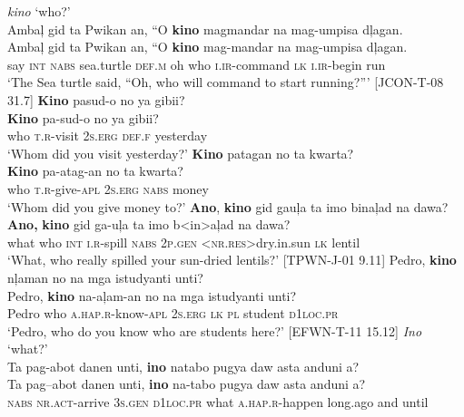 \newpage
\ea
\textit{kino} ‘who?’ \\
Ambaļ  gid  ta  Pwikan  an,  “O  \textbf{kino}  magmandar  na  mag-umpisa  dļagan. \\\smallskip
\gll Ambaļ  gid  ta  Pwikan  an,  “O  \textbf{kino}  mag-mandar  na  mag-umpisa  dļagan. \\
say  \textsc{int}  \textsc{nabs}  sea.turtle  \textsc{def.m}  oh  who  \textsc{i.ir}-command  \textsc{lk}  \textsc{i.ir}-begin  run \\
\glt ‘The Sea turtle said, “Oh, who will command to start running?”' [JCON-T-08 31.7]
\z
\ea
\textbf{Kino}  pasud-o  no  ya  gibii? \\\smallskip
\gll \textbf{Kino}  pa-sud-o  no  ya  gibii? \\
who  \textsc{t.r}-visit  2\textsc{s.erg}  \textsc{def.f}  yesterday \\
\glt ‘Whom did you visit  yesterday?’
\z
\ea
\textbf{Kino}  patagan  no  ta  kwarta? \\\smallskip
\gll \textbf{Kino}  pa-atag-an  no  ta  kwarta? \\
who  \textsc{t.r}-give-\textsc{apl}  2\textsc{s.erg}  \textsc{nabs}  money \\
\glt ‘Whom did you give money to?'
\z
\ea
\textbf{Ano},   \textbf{kino}  gid  gauļa  ta  imo  binaļad  na  dawa? \\\smallskip
\gll \textbf{Ano,}   \textbf{kino}  gid  ga-uļa  ta  imo  b<in>aļad  na  dawa? \\
what    who  \textsc{int}  \textsc{i.r}-spill  \textsc{nabs}  2\textsc{p.gen}  <\textsc{nr.res}>dry.in.sun  \textsc{lk}  lentil \\
\glt ‘What, who really spilled your sun-dried lentils?' [TPWN-J-01 9.11]
\z
\ea
Pedro, \textbf{kino}  nļaman  no  na  mga  istudyanti  unti? \\\smallskip
\gll Pedro,     \textbf{kino}  na-aļam-an  no  na  mga  istudyanti  unti? \\
Pedro  who \textsc{a.hap.r}-know-\textsc{apl}  2\textsc{s.erg}  \textsc{lk}  \textsc{pl}  student  \textsc{d}1\textsc{loc.pr} \\
\glt ‘Pedro, who do you know who are students here?' [EFWN-T-11 15.12]
\z
\ea
\textit{Ino}  ‘what?’ \\
Ta  pag-abot  danen  unti,  \textbf{ino}  natabo  pugya  daw  asta anduni  a? \\\smallskip
\gll Ta  pag--abot  danen  unti,  \textbf{ino}  na-tabo  pugya  daw  asta anduni  a? \\
\textsc{nabs}  \textsc{nr.act}-arrive  3\textsc{s.gen}  \textsc{d}1\textsc{loc.pr}  what  \textsc{a.hap.r}-happen  long.ago  and  until
